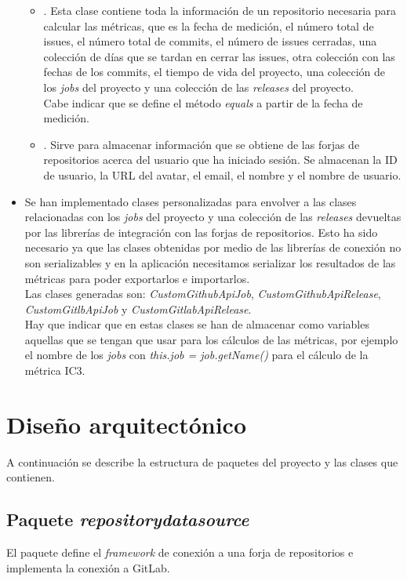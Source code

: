 \begin{itemize}
\begin{itemize}
	\item {}. Esta clase contiene toda la información de un repositorio necesaria para calcular las métricas, que es la fecha de medición, el número total de issues, el número total de commits, el número de issues cerradas, una colección de días que se tardan en cerrar las issues, otra colección con las fechas de los commits, el tiempo de vida del proyecto, una colección de los \textit{jobs} del proyecto y una colección de las \textit{releases} del proyecto. \\
	Cabe indicar que se define el método \textit{equals} a partir de la fecha de medición.
	\item {}. Sirve para almacenar información que se obtiene de las forjas de repositorios acerca del usuario que ha iniciado sesión. Se almacenan la ID de usuario, la URL del avatar, el email, el nombre y el nombre de usuario.
	\end{itemize}
	\item Se han implementado clases personalizadas para envolver a las clases relacionadas con los \textit{jobs} del proyecto y una colección de las \textit{releases} devueltas por las librerías de integración con las forjas de repositorios. Esto ha sido necesario ya que las clases obtenidas por medio de las librerías de conexión no son serializables y en la aplicación necesitamos serializar los resultados de las métricas para poder exportarlos e importarlos.\\
	Las clases generadas son: \textit{CustomGithubApiJob}, \textit{CustomGithubApiRelease}, \textit{CustomGitlbApiJob} y \textit{CustomGitlabApiRelease}.\\
	Hay que indicar que en estas clases se han de almacenar como variables aquellas que se tengan que usar para los cálculos de las métricas, por ejemplo el nombre de los \textit{jobs} con \textit{this.job = job.getName()} para el cálculo de la métrica IC3.
\end{itemize}
	
\section{Diseño arquitectónico}
A continuación se describe la estructura de paquetes del proyecto y las clases que contienen.

\subsection{Paquete \textit{repositorydatasource}}
El paquete define el \textit{framework} de conexión a una forja de repositorios e implementa la conexión a GitLab.

